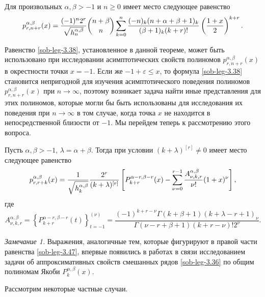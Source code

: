 \begin{theorem} Для произвольных $\alpha, \beta>-1$ и $n\ge0$
имеет место следующее равенство
\begin{equation}\label{sob-leg-3.38}%
p_{r,n+r}^{\alpha,\beta}(x)=\frac{(-1)^n2^{r}}{\sqrt{ h_n^{\alpha,\beta}}}
{n+\beta\choose n}
\sum_{k=0}^n{(-n)_k(n+\alpha+\beta+1)_k\over (\beta+1)_k(k+r)!}
\left({1+x\over 2}\right)^{k+r}.
\end{equation}
\end{theorem}

Равенство \eqref{sob-leg-3.38}, установленное в данной теореме, может быть использовано при исследовании асимптотических свойств полиномов $p_{r,n+r}^{\alpha,\beta}(x)$ в окрестности точки $x=-1$. Если же $-1+\varepsilon\le x$, то формула  \eqref{sob-leg-3.38} становится непригодной для изучения асимптотического  поведения полиномов  $p_{r,n+r}^{\alpha,\beta}(x)$ при $n\to\infty$, поэтому возникает задача найти иные представления для этих полиномов, которые могли бы быть использованы для исследования их поведения при $n\to\infty$ в том случае, когда точка $x$ не находится в непосредственной близости от $-1$. Мы перейдем теперь к рассмотрению этого вопроса.
\begin{theorem} Пусть $\alpha, \beta>-1$, $\lambda=\alpha+\beta$. Тогда  при условии $(k+\lambda)^{[r]}\neq0$ имеет место следующее равенство
\begin{equation}\label{sob-leg-3.47}
p_{r,r+k}^{\alpha,\beta}(x) ={1\over\sqrt{ h_k^{\alpha,\beta}}}
\frac{2^r}{(k+\lambda)^{[r]}}\left[P_{k+r}^{\alpha-r,\beta-r}(x)
-\sum^{r-1}_{\nu=0}\frac{A_{\nu,k,r}^{\alpha,\beta}}{\nu!}(1+x)^{\nu}\right] ,
\end{equation}
где
\begin{equation}\label{sob-leg-3.45}
A_{\nu,k,r}^{\alpha,\beta}=\left\{P_{k+r}^{\alpha-r,\beta-r}(t)\right\}_{t=-1}^{(\nu)}=
\frac{(-1)^{k+r-\nu}\Gamma(k+\beta+1)(k+\lambda-r+1)_{\nu}}
{\Gamma(\nu-r+\beta+1)(k+r-\nu)!2^\nu}.
\end{equation}
\end{theorem}


 \textit{Замечание 1.} Выражения, аналогичные тем, которые фигурируют в правой части равенства  \eqref{sob-leg-3.47}, впервые появились в   работах \cite{Haar-Tcheb-Shar13,sob-jac-discrete-Shar17,Haar-Tcheb-Shar18} в связи исследованием задачи об аппроксимативных свойств смешанных рядов \eqref{sob-leg-3.36} по общим полиномам Якоби $P_{k}^{\alpha,\beta}(x)$.

  Рассмотрим некоторые частные случаи.

